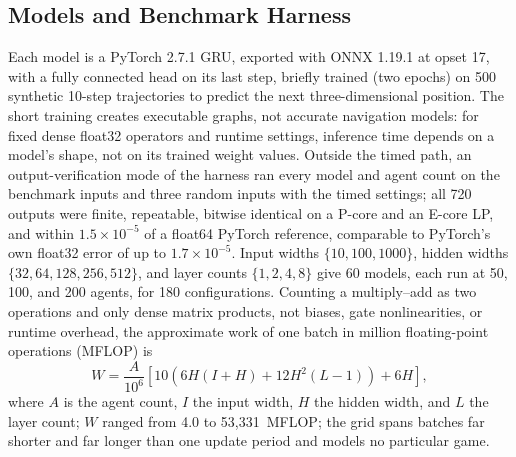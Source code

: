 \documentclass[conference]{IEEEtran}
\begin{document}
\subsection{Models and Benchmark Harness}
Each model is a PyTorch 2.7.1 GRU, exported with ONNX 1.19.1 at opset 17, with a fully connected head on its last step, briefly trained (two epochs) on 500 synthetic 10-step trajectories to predict the next three-dimensional position. The short training creates executable graphs, not accurate navigation models: for fixed dense float32 operators and runtime settings, inference time depends on a model's shape, not on its trained weight values. Outside the timed path, an output-verification mode of the harness ran every model and agent count on the benchmark inputs and three random inputs with the timed settings; all 720 outputs were finite, repeatable, bitwise identical on a P-core and an E-core LP, and within $1.5\times10^{-5}$ of a float64 PyTorch reference, comparable to PyTorch's own float32 error of up to $1.7\times10^{-5}$. Input widths $\{10,100,1000\}$, hidden widths $\{32,64,128,256,512\}$, and layer counts $\{1,2,4,8\}$ give 60 models, each run at 50, 100, and 200 agents, for 180 configurations. Counting a multiply--add as two operations and only dense matrix products, not biases, gate nonlinearities, or runtime overhead, the approximate work of one batch in million floating-point operations (MFLOP) is
\begin{equation}
W=\frac{A}{10^{6}}\left[10\left(6H(I+H)+12H^{2}(L-1)\right)+6H\right],
\label{eq:work}
\end{equation}
where $A$ is the agent count, $I$ the input width, $H$ the hidden width, and $L$ the layer count; $W$ ranged from 4.0 to 53,331~MFLOP; the grid spans batches far shorter and far longer than one update period and models no particular game.
\end{document}
